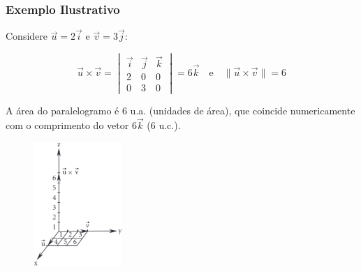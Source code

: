 \subsubsection*{Exemplo Ilustrativo}
Considere $\vec{u} = 2\vec{i}$ e $\vec{v} = 3\vec{j}$:

\[
  \vec{u} \times \vec{v} = 
  \begin{vmatrix}
    \vec{i} & \vec{j} & \vec{k} \\
    2 & 0 & 0 \\
    0 & 3 & 0 
  \end{vmatrix}
  = 6\vec{k} \quad \text{e} \quad \|\vec{u} \times \vec{v}\| = 6
\]

A área do paralelogramo é $6$ u.a. (unidades de área), que coincide
numericamente com o comprimento do vetor $6\vec{k}$ (6 u.c.).

\begin{figure}[h]
  \centering
  \includegraphics[width=0.3\textwidth]{./fig/fig3.6.png}\label{fig:fig3.6}
\end{figure}

